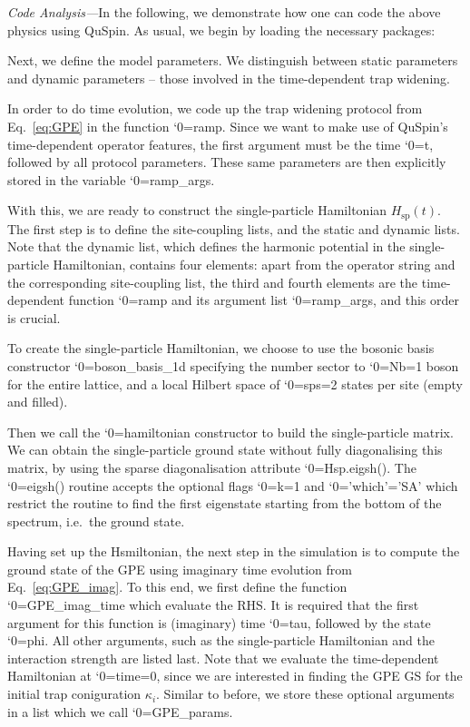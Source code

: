 \documentclass{SciPost}
\newcommand\0{\scalebox{-1}[1]{0}}
\let\svttfamily\ttfamily
\renewcommand\ttfamily{\svttfamily\catcode`0=\active }
\renewcommand\texttt{\bgroup\ttfamily\texttthelp}
\def\texttthelp#1{#1\egroup}
\newcommand{\GPcode}{example4.py}
\begin{document}
\noindent\emph{Code Analysis---}In the following, we demonstrate how one can code the above physics using QuSpin. As usual, we begin by loading the necessary packages:

Next, we define the model parameters. We distinguish between static parameters and dynamic parameters -- those involved in the time-dependent trap widening.

In order to do time evolution, we code up the trap widening protocol from Eq.~\eqref{eq:GPE} in the function \texttt{ramp}. Since we want to make use of QuSpin's time-dependent operator features, the first argument must be the time \texttt{t}, followed by all protocol parameters. These same parameters are then explicitly stored in the variable \texttt{ramp\_args}.

With this, we are ready to construct the single-particle Hamiltonian $H_\mathrm{sp}(t)$. The first step is to define the site-coupling lists, and the static and dynamic lists. Note that the dynamic list, which defines the harmonic potential in the single-particle Hamiltonian, contains four elements: apart from the operator string and the corresponding site-coupling list, the third and fourth elements are the time-dependent function \texttt{ramp} and its argument list \texttt{ramp\_args}, and this order is crucial.

To create the single-particle Hamiltonian, we choose to use the bosonic basis constructor \texttt{boson\_basis\_1d} specifying the number sector to \texttt{Nb=1} boson for the entire lattice, and a local Hilbert space of \texttt{sps=2} states per site (empty and filled). 

Then we call the \texttt{hamiltonian} constructor to build the single-particle matrix. We can obtain the single-particle ground state without fully diagonalising this matrix, by using the sparse diagonalisation attribute \texttt{Hsp.eigsh()}. The \texttt{eigsh()} routine accepts the optional flags \texttt{k=1} and \texttt{'which'='SA'} which restrict the routine to find the first eigenstate starting from the bottom of the spectrum, i.e.~the ground state.	

Having set up the Hsmiltonian, the next step in the simulation is to compute the ground state of the GPE using imaginary time evolution from Eq.~\eqref{eq:GPE_imag}. To this end, we first define the function \texttt{GPE\_imag\_time} which evaluate the RHS. It is required that the first argument for this function is (imaginary) time \texttt{tau}, followed by the state \texttt{phi}. All other arguments, such as the single-particle Hamiltonian and the interaction strength are listed last. Note that we evaluate the time-dependent Hamiltonian at \texttt{time=0}, since we are interested in finding the GPE GS for the initial trap coniguration $\kappa_i$. Similar to before, we store these optional arguments in a list which we call \texttt{GPE\_params}. 
\end{document}
